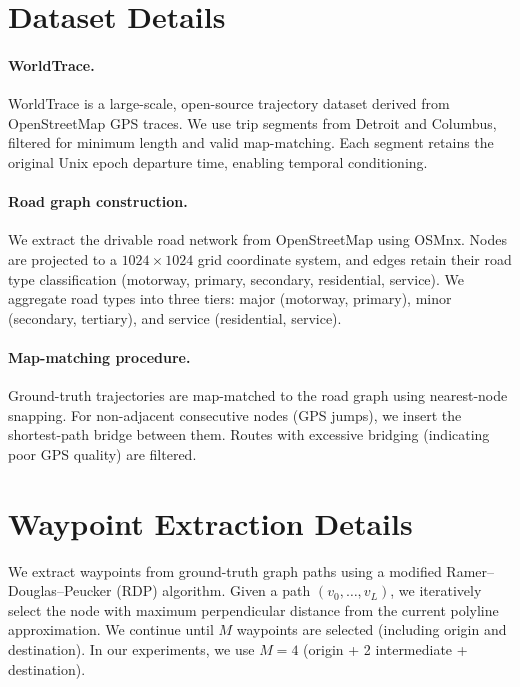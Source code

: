 
\section{Dataset Details}
\label{app:data}

\paragraph{WorldTrace.}
WorldTrace is a large-scale, open-source trajectory dataset derived from OpenStreetMap GPS traces.
We use trip segments from Detroit and Columbus, filtered for minimum length and valid map-matching.
Each segment retains the original Unix epoch departure time, enabling temporal conditioning.

\paragraph{Road graph construction.}
We extract the drivable road network from OpenStreetMap using OSMnx.
Nodes are projected to a $1024 \times 1024$ grid coordinate system, and edges retain their road type classification (motorway, primary, secondary, residential, service).
We aggregate road types into three tiers: major (motorway, primary), minor (secondary, tertiary), and service (residential, service).

\paragraph{Map-matching procedure.}
Ground-truth trajectories are map-matched to the road graph using nearest-node snapping.
For non-adjacent consecutive nodes (GPS jumps), we insert the shortest-path bridge between them.
Routes with excessive bridging (indicating poor GPS quality) are filtered.

\section{Waypoint Extraction Details}
\label{app:waypoints}

We extract waypoints from ground-truth graph paths using a modified Ramer--Douglas--Peucker (RDP) algorithm.
Given a path $(v_0, \dots, v_L)$, we iteratively select the node with maximum perpendicular distance from the current polyline approximation.
We continue until $M$ waypoints are selected (including origin and destination).
In our experiments, we use $M=4$ (origin + 2 intermediate + destination).

